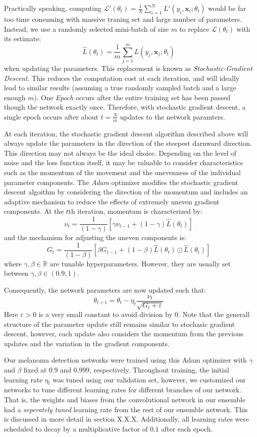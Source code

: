 \documentclass [MAS] {uclathes}
\begin{document}
Practically speaking, computing $\mathcal{L}'(\theta_t) = \frac{1}{N} \sum_{i=1}^{N} L'(y_i, \mathbf{x}_i; \theta_t)$ would be far too time consuming with massive traning set and large number of parameters. Instead, we use a randomly selected mini-batch of size $m$ to replace $\mathcal{L}(\theta_t)$ with its estimate: $$\hat{L}(\theta_t) = \frac{1}{m} \sum_{j=1}^{m} L(y_j, \mathbf{x}_j; \theta_t)$$ when updating the parameters. This replacement is known as \textit{Stochastic-Gradient Descent}. This reduces the computation cost at each iteration, and will ideally lead to similar results (assuming a true randomly sampled batch and a large enough $m$). One \textit{Epoch} occurs after the entire training set has been passed though the network exactly once. Therefore, with stochastic gradient descent, a single epoch occurs after about $t=\frac{N}{m}$ updates to the network paramters.

At each iteration, the stochastic gradient descent algorithm described above will always update the parameters in the direction of the steepest darnward direction. This direction may not always be the ideal choice. Depending on the level of noise and the loss function itself, it may be valuable to consider characteristics such as the momentum of the movement and the unevenness of the individual parameter components. The \textit{Adam} optimizer modifies the stochastic gradient descent algoithm by considering the direction of the momentum and includes an adaptive mechanism to reduce the effects of extremely uneven gradient components. At the $t$th iteration, momentum is characterized by: $$\nu_t = \frac{1}{(1-\gamma)} \left[ \gamma \nu_{t-1} + (1-\gamma)\hat{L}(\theta_t) \right]$$ and the mechanism for adjusting the uneven components is: $$G_t = \frac{1}{(1-\beta)} \left[ \beta G_{t-1} + (1-\beta)\hat{L}(\theta_t) \odot \hat{L}(\theta_t)\right]$$ where $\gamma, \beta \in \mathbb{R}$ are tunable hyperparameters. However, they are usually set between $\gamma, \beta \in (0.9, 1)$. 

Consequently, the network parameters are now updated such that: $$\theta_{t+1} = \theta_{t} - \eta_t \frac{\nu_t}{\sqrt{G_t + \varepsilon}}$$ Here $\varepsilon>0$ is a very small constant to avoid division by 0. Note that the generall structure of the parameter update still remains similar to stochasic gradient descent, however, each update also considers the momentum from the previous updates and the variation in the gradient components.

Our melanoma detection networks were trained using this Adam optimizer with $\gamma$ and $\beta$ fixed at $0.9$ and $0.999$, respectively. Throughout training, the initial learning rate $\eta_t$ was tuned using our validation set, however, we customized our networks to tune different learning rates for different branches of our network. That is, the weights and biases from the convolutional network in our ensemble had a \textit{seperately tuned} learning rate from the rest of our ensemble network. This is discussed in more detail in section X.X.X. Additionally, all learning rates were scheduled to decay by a multiplicative factor of $0.1$ after each epoch.
\end{document}
